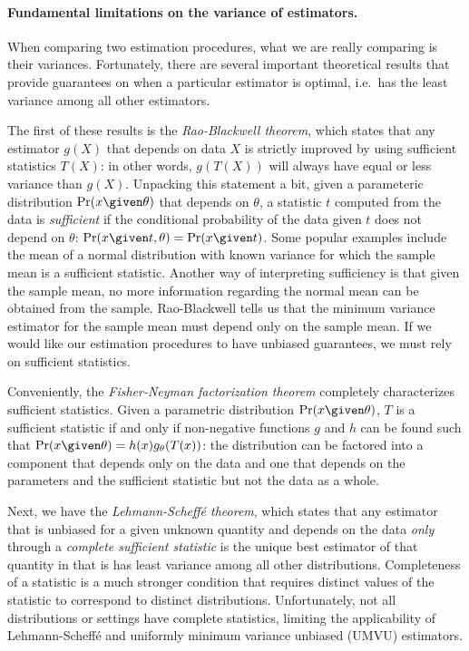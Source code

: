 \paragraph{Fundamental limitations on the variance of estimators.}
When comparing two estimation procedures, what we are really comparing is their variances.
Fortunately, there are several important theoretical results that provide guarantees on when a particular estimator is optimal, i.e.\ has the least variance among all other estimators.

The first of these results is the \textit{Rao-Blackwell theorem}, which states that any estimator $g(X)$ that depends on data $X$ is strictly improved by using sufficient statistics $T(X)$: in other words, $g(T(X))$ will always have equal or less variance than $g(X)$.
Unpacking this statement a bit, given a parameteric distribution $\Pr(x \given \theta)$ that depends on $\theta$, a statistic $t$  computed from the data is \textit{sufficient} if the conditional probability of the data given $t$ does not depend on $\theta$: $\Pr(x \given t, \theta) = \Pr(x \given t)$.
Some popular examples include the mean of a normal distribution with known variance for which the sample mean is a sufficient statistic.
Another way of interpreting sufficiency is that given the sample mean, no more information regarding the normal mean can be obtained from the sample. 
Rao-Blackwell tells us that the minimum variance estimator for the sample mean must depend only on the sample mean.
If we would like our estimation procedures to have unbiased guarantees, we must rely on sufficient statistics.

Conveniently, the \textit{Fisher-Neyman factorization theorem} completely characterizes sufficient statistics.
Given a parametric distribution $\Pr(x \given \theta)$, $T$ is a sufficient statistic if and only if non-negative functions $g$ and $h$ can be found such that $\Pr(x \given \theta) = h(x) g_\theta(T(x))$:
  the distribution can be factored into a component that depends only on the data and one that depends on the parameters and the sufficient statistic but not the data as a whole.

Next, we have the \textit{Lehmann-Scheff\'{e} theorem}, which states that any estimator that is unbiased for a given unknown quantity and depends on the data \textit{only} through a \textit{complete sufficient statistic} is the unique best estimator of that quantity in that is has least variance among all other distributions.
Completeness of a statistic is a much stronger condition that requires distinct values of the statistic to correspond to distinct distributions.
Unfortunately, not all distributions or settings have complete statistics, limiting the applicability of Lehmann-Scheff\'{e} and uniformly minimum variance unbiased (UMVU) estimators.

